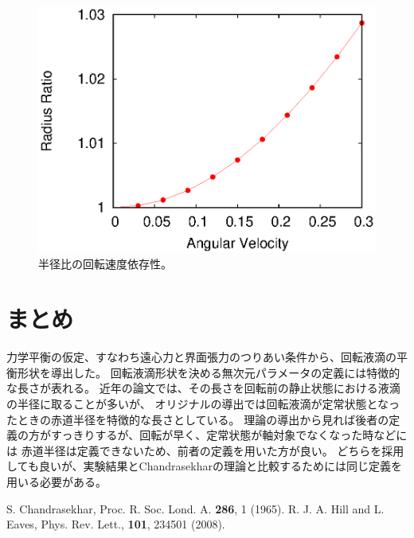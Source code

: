 \documentclass{jarticle}
\begin{document}
\begin{figure}[htbp]
\begin{center}
\includegraphics[width=0.5 \linewidth]{rotate.eps}
\end{center}
\caption{半径比の回転速度依存性。
}\label{fig::ratio}
\end{figure}

\section{まとめ}

力学平衡の仮定、すなわち遠心力と界面張力のつりあい条件から、回転液滴の平衡形状を導出した。
回転液滴形状を決める無次元パラメータの定義には特徴的な長さが表れる。
近年の論文では、その長さを回転前の静止状態における液滴の半径に取ることが多いが、
オリジナルの導出では回転液滴が定常状態となったときの赤道半径を特徴的な長さとしている。
理論の導出から見れば後者の定義の方がすっきりするが、回転が早く、定常状態が軸対象でなくなった時などには
赤道半径は定義できないため、前者の定義を用いた方が良い。
どちらを採用しても良いが、実験結果とChandrasekharの理論と比較するためには同じ定義を用いる必要がある。

\begin{thebibliography}{9}
 S. Chandrasekhar,  Proc. R. Soc. Lond. A. {\bf 286}, 1 (1965).
 R. J. A. Hill and L. Eaves, Phys. Rev. Lett., {\bf 101}, 234501 (2008). 
\end{thebibliography}
\end{document}
